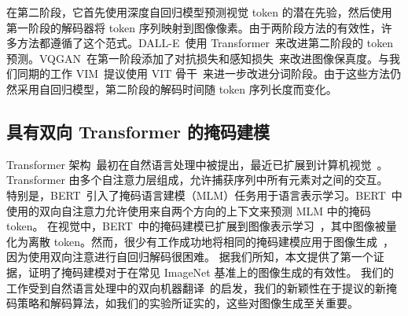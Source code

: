 \noindent 在第二阶段，它首先使用深度自回归模型预测视觉 token 的潜在先验，然后使用第一阶段的解码器将 token 序列映射到图像像素。由于两阶段方法的有效性，许多方法都遵循了这个范式。DALL-E~\cite{Ramesh21dalle}使用 Transformer~\cite{Vaswani17attention}来改进第二阶段的 token 预测。VQGAN~\cite{Esser21vqgan}在第一阶段添加了对抗损失和感知损失~\cite{johnson2016perceptual, zhang2018unreasonable}来改进图像保真度。与我们同期的工作 VIM~\cite{vim2021}提议使用 VIT 骨干~\cite{dosovitskiy2021vit}来进一步改进分词阶段。由于这些方法仍然采用自回归模型，第二阶段的解码时间随 token 序列长度而变化。 

\subsection{具有双向 Transformer 的掩码建模}
Transformer 架构~\cite{Vaswani17attention}最初在自然语言处理中被提出，最近已扩展到计算机视觉~\cite{dosovitskiy2021vit, caron2021dino}。
Transformer 由多个自注意力层组成，允许捕获序列中所有元素对之间的交互。
特别是，BERT~\cite{Devlin19bert}引入了掩码语言建模（MLM）任务用于语言表示学习。BERT~\cite{Devlin19bert}中使用的双向自注意力允许使用来自两个方向的上下文来预测 MLM 中的掩码 token。
在视觉中，BERT~\cite{Devlin19bert}中的掩码建模已扩展到图像表示学习~\cite{he2021mae, Bao2022Beit}，其中图像被量化为离散 token。然而，很少有工作成功地将相同的掩码建模应用于图像生成~\cite{zhang2021ufcbert}，因为使用双向注意进行自回归解码很困难。
据我们所知，本文提供了第一个证据，证明了掩码建模对于在常见 ImageNet 基准上的图像生成的有效性。
我们的工作受到自然语言处理中的双向机器翻译~\cite{ghazvininejad2019maskpredict, gu2020fully, gu2017non}的启发，我们的新颖性在于提议的新掩码策略和解码算法，如我们的实验所证实的，这些对图像生成至关重要。
